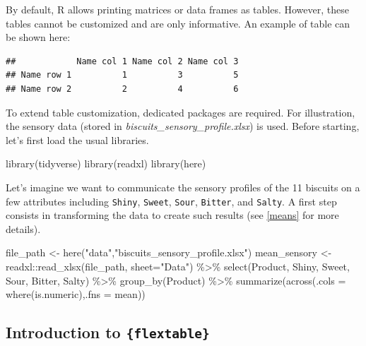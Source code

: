 \documentclass[
]{krantz}
\makeatletter
\newenvironment{Shaded}{\begin{snugshade}}{\end{snugshade}}
\newcommand{\AttributeTok}[1]{\textcolor[rgb]{0.61,0.61,0.61}{#1}}
\newcommand{\FunctionTok}[1]{\textcolor[rgb]{0,0,0}{#1}}
\newcommand{\NormalTok}[1]{#1}
\newcommand{\OtherTok}[1]{\textcolor[rgb]{0.37,0.37,0.37}{#1}}
\newcommand{\SpecialCharTok}[1]{\textcolor[rgb]{0,0,0}{#1}}
\newcommand{\StringTok}[1]{\textcolor[rgb]{0.5,0.5,0.5}{#1}}
\newenvironment{kframe}{%
\medskip{}
\setlength{\fboxsep}{.8em}
 \def\at@end@of@kframe{}%
 \ifinner\ifhmode%
  \def\at@end@of@kframe{\end{minipage}}%
  \begin{minipage}{\columnwidth}%
 \fi\fi%
 \def\FrameCommand##1{\hskip\@totalleftmargin \hskip-\fboxsep
 \colorbox{shadecolor}{##1}\hskip-\fboxsep
     \hskip-\linewidth \hskip-\@totalleftmargin \hskip\columnwidth}%
 \MakeFramed {\advance\hsize-\width
   \@totalleftmargin\z@ \linewidth\hsize
   \@setminipage}}%
 {\par\unskip\endMakeFramed%
 \at@end@of@kframe}
\renewenvironment{Shaded}{\begin{kframe}}{\end{kframe}}
\makeatother
\begin{document}
By default, R allows printing matrices or data frames as tables. However, these tables cannot be customized and are only informative. An example of table can be shown here:

\begin{verbatim}
##            Name col 1 Name col 2 Name col 3
## Name row 1          1          3          5
## Name row 2          2          4          6
\end{verbatim}

To extend table customization, dedicated packages are required. For illustration, the sensory data (stored in \emph{biscuits\_sensory\_profile.xlsx}) is used.
Before starting, let's first load the usual libraries.

\begin{Shaded}
\begin{Highlighting}[]
\FunctionTok{library}\NormalTok{(tidyverse)}
\FunctionTok{library}\NormalTok{(readxl)}
\FunctionTok{library}\NormalTok{(here)}
\end{Highlighting}
\end{Shaded}

Let's imagine we want to communicate the sensory profiles of the 11 biscuits on a few attributes including \texttt{Shiny}, \texttt{Sweet}, \texttt{Sour}, \texttt{Bitter}, and \texttt{Salty}. A first step consists in transforming the data to create such results (see \ref{means} for more details).

\begin{Shaded}
\begin{Highlighting}[]
\NormalTok{file\_path }\OtherTok{\textless{}{-}} \FunctionTok{here}\NormalTok{(}\StringTok{"data"}\NormalTok{,}\StringTok{"biscuits\_sensory\_profile.xlsx"}\NormalTok{) }
\NormalTok{mean\_sensory }\OtherTok{\textless{}{-}}\NormalTok{ readxl}\SpecialCharTok{::}\FunctionTok{read\_xlsx}\NormalTok{(file\_path, }\AttributeTok{sheet=}\StringTok{"Data"}\NormalTok{) }\SpecialCharTok{\%\textgreater{}\%} 
  \FunctionTok{select}\NormalTok{(Product, Shiny, Sweet, Sour, Bitter, Salty) }\SpecialCharTok{\%\textgreater{}\%}
  \FunctionTok{group\_by}\NormalTok{(Product) }\SpecialCharTok{\%\textgreater{}\%}
  \FunctionTok{summarize}\NormalTok{(}\FunctionTok{across}\NormalTok{(}\AttributeTok{.cols =} \FunctionTok{where}\NormalTok{(is.numeric),}\AttributeTok{.fns =}\NormalTok{ mean))}
\end{Highlighting}
\end{Shaded}

\hypertarget{flextable}{%
\subsection{\texorpdfstring{Introduction to \texttt{\{flextable\}}}{Introduction to \{flextable\}}}\label{flextable}}
\end{document}
